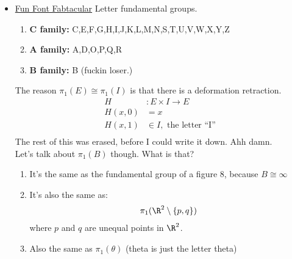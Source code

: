 \begin{itemize}
    \item \underline{Fun Font Fabtacular}
        Letter fundamental groups.
        \begin{enumerate}
            \item \textbf{C family:} C,E,F,G,H,I,J,K,L,M,N,S,T,U,V,W,X,Y,Z
            \item \textbf{A family:} A,D,O,P,Q,R
            \item \textbf{B family:} B (fuckin loser.)
        \end{enumerate}
        The reason $\pi_1(E)\cong\pi_1(I)$ is that there
        is a deformation retraction.
        \begin{align*}
            H&: E\times I \rightarrow E\\
            H(x,0)&=x\\
            H(x,1)&\in I, \text{ the letter ``I'' }\\
        \end{align*}
        The rest of this was erased, before I could write it down. Ahh damn.\\
        Let's talk about $\pi_1(B)$ though. What is that?
        \begin{enumerate}
            \item It's the same as the fundamental group of a figure 8, because $B\cong \infty$
            \item It's also the same as:
                \begin{align*}
                    \pi_1(\R^2\setminus \{p,q\})\\
                \end{align*}
                where $p$ and $q$ are unequal points in $\R^2$.
            \item Also the same as $\pi_1(\theta)$ (theta is just the letter theta)
                
        \end{enumerate}
\end{itemize}
